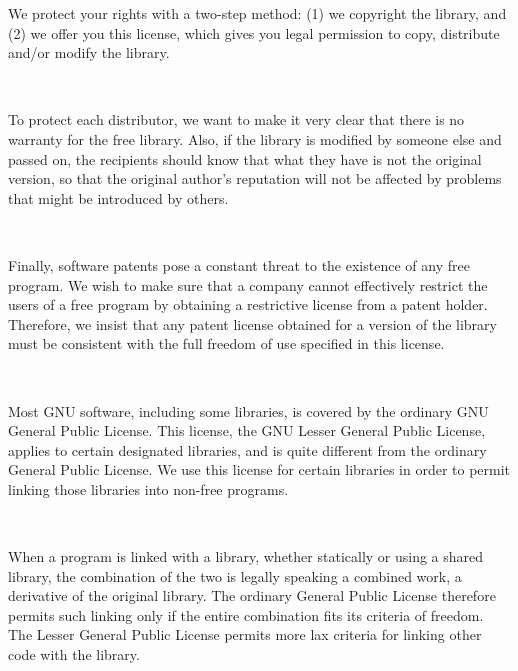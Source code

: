 \begin{center}
\begin{minipage}{5.25in}
We protect your rights with a two-step method: (1) we copyright the
library, and (2) we offer you this license, which gives you legal
permission to copy, distribute and/or modify the library.
\end{minipage}
\\[2.5mm]

\begin{minipage}{5.25in}
To protect each distributor, we want to make it very clear that
there is no warranty for the free library.  Also, if the library is
modified by someone else and passed on, the recipients should know
that what they have is not the original version, so that the original
author's reputation will not be affected by problems that might be
introduced by others.
\end{minipage}
\\[2.5mm]

\begin{minipage}{5.25in}
Finally, software patents pose a constant threat to the existence of
any free program.  We wish to make sure that a company cannot
effectively restrict the users of a free program by obtaining a
restrictive license from a patent holder.  Therefore, we insist that
any patent license obtained for a version of the library must be
consistent with the full freedom of use specified in this license.
\end{minipage}
\\[2.5mm]

\begin{minipage}{5.25in}
Most GNU software, including some libraries, is covered by the
ordinary GNU General Public License.  This license, the GNU Lesser
General Public License, applies to certain designated libraries, and
is quite different from the ordinary General Public License.  We use
this license for certain libraries in order to permit linking those
libraries into non-free programs.
\end{minipage}
\\[2.5mm]

\begin{minipage}{5.25in}
When a program is linked with a library, whether statically or using
a shared library, the combination of the two is legally speaking a
combined work, a derivative of the original library.  The ordinary
General Public License therefore permits such linking only if the
entire combination fits its criteria of freedom.  The Lesser General
Public License permits more lax criteria for linking other code with
the library.
\end{minipage}
\\[2.5mm]


\end{center}

